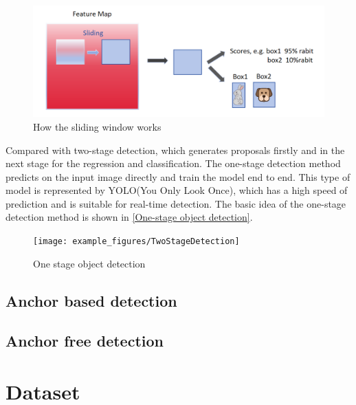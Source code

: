   \begin{figure}[!htbp]
    \centering
    \includegraphics[width=0.9\linewidth]{example_images/Region Proposal}
    \caption{How the sliding window works}
    \label{How the sliding window works}
  \end{figure}
  Compared with two-stage detection, which generates proposals firstly and in the next stage for the regression and classification. The one-stage detection method 
  predicts on the input image directly and train the model end to end. This type of model is represented by YOLO(You Only Look Once), which has a high speed of 
  prediction and is suitable for real-time detection. The basic idea of the one-stage detection method is shown in \autoref{One-stage object detection}.
  \begin{figure}[!htbp]
    \centering
    \texttt{[image: example\_figures/TwoStageDetection]}
    \caption{One stage object detection}
    \label{One stage object detection}
  \end{figure}
\subsection{Anchor based detection}
\subsection{Anchor free detection}
\section{Dataset}